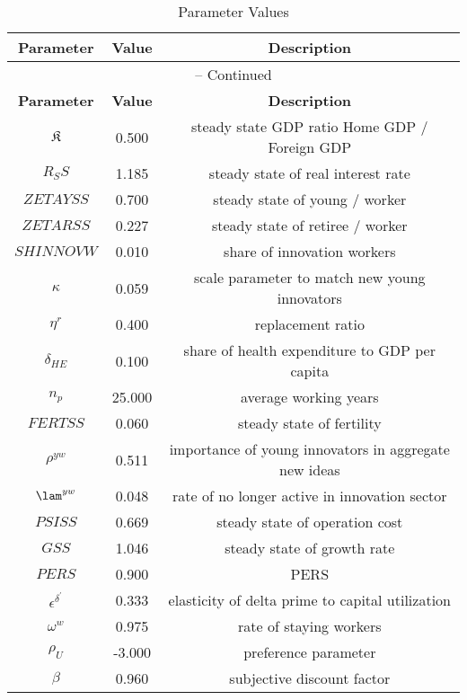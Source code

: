 \begin{center}
\begin{longtable}{ccc}
\caption{Parameter Values}\\%
\toprule%
\multicolumn{1}{c}{\textbf{Parameter}} &
\multicolumn{1}{c}{\textbf{Value}} &
 \multicolumn{1}{c}{\textbf{Description}}\\%
\midrule%
\endfirsthead
\multicolumn{3}{c}{{\tablename} \thetable{} -- Continued}\\%
\midrule%
\multicolumn{1}{c}{\textbf{Parameter}} &
\multicolumn{1}{c}{\textbf{Value}} &
  \multicolumn{1}{c}{\textbf{Description}}\\%
\midrule%
\endhead
${\mathfrak{K}}$ 	 & 	 0.500 	 & 	 steady state GDP ratio \: Home GDP / Foreign GDP \\
${R_SS}$ 	 & 	 1.185 	 & 	 steady state of real interest rate\\
${ZETAYSS}$ 	 & 	 0.700 	 & 	 steady state of young / worker \\
${ZETARSS}$ 	 & 	 0.227 	 & 	 steady state of retiree / worker \\
${SHINNOVW}$ 	 & 	 0.010 	 & 	 share of innovation workers\\
${\kappa}$ 	 & 	 0.059 	 & 	 scale parameter to match new young innovators\\
${\eta^r}$ 	 & 	 0.400 	 & 	 replacement ratio\\
${\delta_{HE}}$ 	 & 	 0.100 	 & 	 share of health expenditure to GDP per capita\\
${n_p}$ 	 & 	 25.000 	 & 	 average working years\\
${FERTSS}$ 	 & 	 0.060 	 & 	 steady state of fertility\\
${\rho^{yw}}$ 	 & 	 0.511 	 & 	 importance of young innovators in aggregate new ideas\\
${\lam^{yw}}$ 	 & 	 0.048 	 & 	 rate of no longer active in innovation sector\\
${PSISS}$ 	 & 	 0.669 	 & 	 steady state of operation cost\\
${GSS}$ 	 & 	 1.046 	 & 	 steady state of growth rate\\
$PERS$ 	 & 	 0.900 	 & 	 PERS\\
${\epsilon^{\delta^{\prime}}}$ 	 & 	 0.333 	 & 	 elasticity of delta prime to capital utilization\\
${\omega^w}$ 	 & 	 0.975 	 & 	 rate of staying workers\\
${\rho_U}$ 	 & 	 -3.000 	 & 	 preference parameter\\
${\beta}$ 	 & 	 0.960 	 & 	 subjective discount factor\\

\end{longtable}
\end{center}
